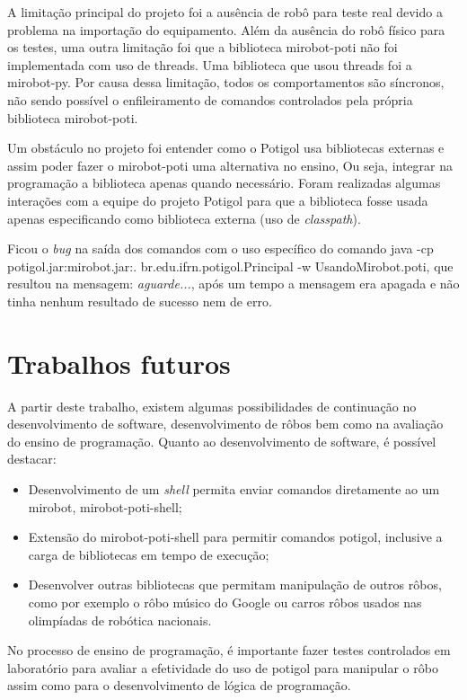 A limitação principal do projeto foi a ausência de robô para teste real devido a problema na importação do equipamento.
Além da ausência do robô físico para
os testes, uma outra limitação foi que a biblioteca mirobot-poti não foi implementada com uso de
threads. Uma biblioteca que usou threads foi a mirobot-py.
Por causa dessa limitação, todos os comportamentos são síncronos, não sendo possível o enfileiramento de comandos controlados pela própria biblioteca mirobot-poti.

Um obstáculo no projeto foi entender como o Potigol usa bibliotecas externas e assim poder fazer o mirobot-poti uma alternativa no ensino, Ou seja, integrar na programação a biblioteca apenas quando necessário.
Foram realizadas algumas interações com a equipe do projeto Potigol para que a biblioteca fosse usada apenas especificando como biblioteca externa (uso de \textit{classpath}). 

Ficou o \textit{bug} na saída dos comandos com o uso específico do comando java -cp potigol.jar:mirobot.jar:. br.edu.ifrn.potigol.Principal -w UsandoMirobot.poti, que resultou na mensagem: \textit{aguarde...}, após um tempo a mensagem era apagada e não tinha nenhum resultado de sucesso nem de erro.



\section{Trabalhos futuros}

A partir deste trabalho, existem algumas possibilidades de continuação no desenvolvimento de software, desenvolvimento de rôbos bem como na avaliação do ensino de programação.
Quanto ao desenvolvimento de software, é possível destacar:

\begin{itemize}
    \item Desenvolvimento de um \textit{shell} permita enviar comandos diretamente ao um mirobot, mirobot-poti-shell;
    \item Extensão do mirobot-poti-shell para permitir comandos potigol, inclusive a carga de bibliotecas em tempo de execução;
    \item Desenvolver outras bibliotecas que permitam manipulação de outros rôbos, como por exemplo o rôbo músico do Google ou carros rôbos usados nas olimpíadas de robótica nacionais.
\end{itemize}


No processo de ensino de programação, é importante fazer testes controlados em laboratório para avaliar a efetividade do uso de potigol para manipular o rôbo assim como para o desenvolvimento de lógica de programação.
